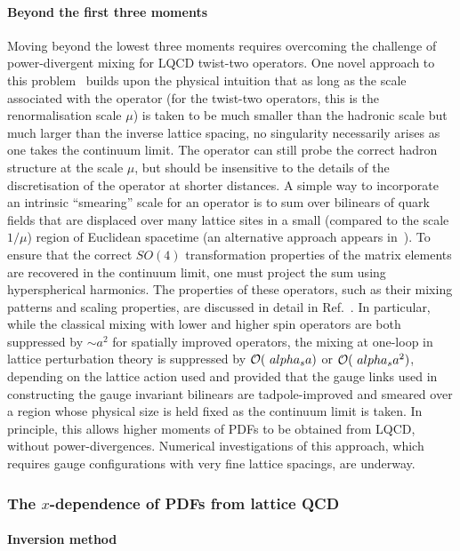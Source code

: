 \paragraph*{Beyond the first three moments} Moving beyond the lowest three moments requires overcoming the challenge of power-divergent mixing for LQCD twist-two operators. One novel approach to this problem~\cite{Davoudi:2012ya} builds upon the physical intuition that as long as the scale associated with the operator (for the twist-two operators, this is the renormalisation scale $\mu$) is taken to be much smaller than the hadronic scale but much larger than the inverse lattice spacing, no singularity necessarily arises as one takes the continuum limit. The operator can still probe the correct hadron structure at the scale $\mu$, but should be insensitive to the details of the discretisation of the operator at shorter distances. A simple way to incorporate an intrinsic ``smearing” scale for an operator is to sum over bilinears of quark fields that are displaced over many lattice sites in a small (compared to the scale $1/\mu$) region of Euclidean spacetime (an alternative approach appears in~\cite{Monahan:2015lha}). To ensure that the correct $SO(4)$ transformation properties of the matrix elements are recovered in the continuum limit, one must project the sum using hyperspherical harmonics. The properties of these operators, such as their mixing patterns and scaling properties, are discussed in detail in
Ref.~\cite{Davoudi:2012ya}. In particular, while the classical mixing with lower and higher spin operators are both suppressed by $\sim a^2$ for spatially improved operators, the mixing at one-loop in lattice perturbation theory is suppressed by ${\cal O}(\ alpha_s a)$ or ${\cal O}(\ alpha_s a^2)$, depending on the lattice action used and provided that the gauge links used in constructing the gauge invariant bilinears are tadpole-improved and smeared over a region whose physical size is held fixed as the continuum limit is taken. In principle, this allows higher moments of PDFs to be obtained from LQCD, without power-divergences. Numerical investigations of this approach, which requires gauge configurations with very fine lattice spacings, are underway. 

\subsubsection{The $x$-dependence of PDFs from lattice QCD}

\paragraph*{Inversion method}

